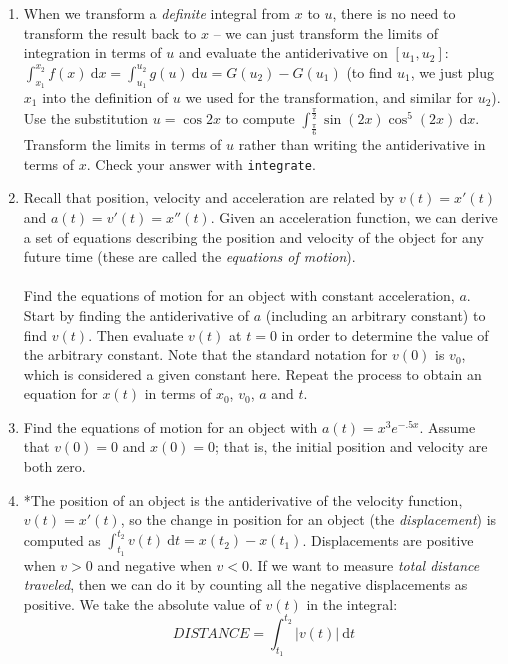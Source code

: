 \documentclass[10.5pt,twoside]{report}
\theoremstyle{definition}
\begin{document}
\begin{enumerate}
\item When we transform a \textit{definite} integral from $x$ to $u$, there is no need to transform the result back to $x$ -- we can just transform the limits of integration in terms of $u$ and evaluate the antiderivative on $[u_1,u_2]$:  $\displaystyle \int_{x_1}^{x_2} f(x)\ \mathrm{d}x = \int_{u_1}^{u_2} g(u)\ \mathrm{d}u = G(u_2)-G(u_1)$ (to find $u_1$, we just plug $x_1$ into the definition of $u$ we used for the transformation, and similar for $u_2$). Use the substitution $u=\cos{2x}$ to compute $\displaystyle \int_{\frac{\pi}{6}}^{\frac{\pi}{2}} \sin{(2x)} \cos^5{(2x)} \ \mathrm{d}x$.  Transform the limits in terms of $u$ rather than writing the antiderivative in terms of $x$. Check your answer with \verb|integrate|.

\item Recall that position, velocity and acceleration are related by $v(t)=x'(t)$ and $a(t)=v'(t)=x''(t)$.  Given an acceleration function, we can derive a set of equations describing the position and velocity of the object for any future time (these are called the \textit{equations of motion}).\\
${}$\\
Find the equations of motion for an object with constant acceleration, $a$.  Start by finding the antiderivative of $a$ (including an arbitrary constant) to find $v(t)$.  Then evaluate $v(t)$ at $t=0$ in order to determine the value of the arbitrary constant.  Note that the standard notation for $v(0)$ is $v_0$, which is considered a given constant here.  Repeat the process to obtain an equation for $x(t)$ in terms of $x_0$, $v_0$, $a$ and $t$.  

\item Find the equations of motion for an object with $a(t)=x^3 e^{-.5x}$.  Assume that $v(0)=0$ and $x(0)=0$; that is, the initial position and velocity are both zero.

\item *The position of an object is the antiderivative of the velocity function, $v(t)=x'(t)$, so the change in position for an object (the \textit{displacement}) is computed as $\displaystyle \int_{t_1}^{t_2} v(t) \ \mathrm{d}t=x(t_2)-x(t_1)$.  Displacements are positive when $v>0$ and negative when $v<0$.  If we want to measure \textit{total distance traveled}, then we can do it by counting all the negative displacements as positive.  We take the absolute value of $v(t)$ in the integral:
$$DISTANCE=\int_{t_1}^{t_2} |v(t)| \ \mathrm{d}t$$


\end{enumerate}
\end{document}
